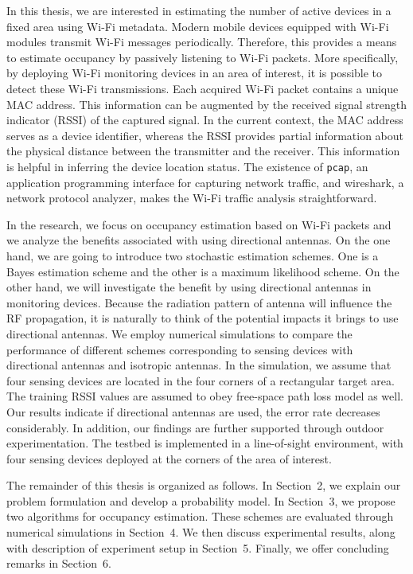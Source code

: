 In this thesis, we are interested in estimating the number of active devices in a fixed area using Wi-Fi metadata.
Modern mobile devices equipped with Wi-Fi modules transmit Wi-Fi messages periodically.
Therefore, this provides a means to estimate occupancy by passively listening to Wi-Fi packets.
More specifically, by deploying Wi-Fi monitoring devices in an area of interest, it is possible to detect these Wi-Fi transmissions.
Each acquired Wi-Fi packet contains a unique MAC address.
This information can be augmented by the received signal strength indicator (RSSI) of the captured signal.
In the current context, the MAC address serves as a device identifier, whereas the RSSI provides partial information about the physical distance between the transmitter and the receiver.
This information is helpful in inferring the device location status.
The existence of \texttt{pcap}, an application programming interface for capturing network traffic, and wireshark, a network protocol analyzer, makes the Wi-Fi traffic analysis straightforward. 

In the research, we focus on occupancy estimation based on Wi-Fi packets and we analyze the benefits associated with using directional antennas.
On the one hand, we are going to introduce two stochastic estimation schemes.
One is a Bayes estimation scheme and the other is a maximum likelihood scheme.
On the other hand, we will investigate the benefit by using directional antennas in monitoring devices.
Because the radiation pattern of antenna will influence the RF propagation, it is naturally to think of the potential impacts it brings to use directional antennas. 
We employ numerical simulations to compare the performance of different schemes corresponding to sensing devices with directional antennas and isotropic antennas.
In the simulation, we assume that four sensing devices are located in the four corners of a rectangular target area.
The training RSSI values are assumed to obey free-space path loss model as well.
Our results indicate if directional antennas are used, the error rate decreases considerably.
In addition, our findings are further supported through outdoor experimentation.
The testbed is implemented in a line-of-sight environment, with four sensing devices deployed at the corners of the area of interest.

The remainder of this thesis is organized as follows.
In Section~2, we explain our problem formulation and develop a probability model.
In Section~3, we propose two algorithms for occupancy estimation.
These schemes are evaluated through numerical simulations in Section~4.
We then discuss experimental results, along with description of experiment setup in Section~5.
Finally, we offer concluding remarks in Section~6.



